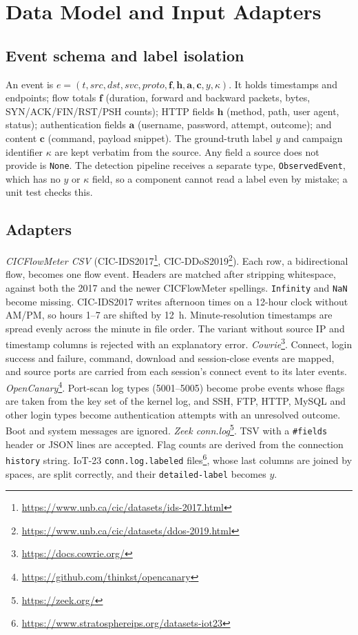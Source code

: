 \documentclass[conference]{IEEEtran}
\begin{document}
\section{Data Model and Input Adapters}\label{sec:data}
\subsection{Event schema and label isolation}
An event is $e=(t, \mathit{src}, \mathit{dst}, \mathit{svc}, \mathit{proto}, \mathbf{f}, \mathbf{h}, \mathbf{a}, \mathbf{c}, y, \kappa)$. It holds timestamps and endpoints; flow totals $\mathbf{f}$ (duration, forward and backward packets, bytes, SYN/ACK/FIN/RST/PSH counts); HTTP fields $\mathbf{h}$ (method, path, user agent, status); authentication fields $\mathbf{a}$ (username, password, attempt, outcome); and content $\mathbf{c}$ (command, payload snippet). The ground-truth label $y$ and campaign identifier $\kappa$ are kept verbatim from the source. Any field a source does not provide is \texttt{None}. The detection pipeline receives a separate type, \texttt{ObservedEvent}, which has no $y$ or $\kappa$ field, so a component cannot read a label even by mistake; a unit test checks this.

\subsection{Adapters}
\textit{CICFlowMeter CSV} (CIC-IDS2017\footnote{\url{https://www.unb.ca/cic/datasets/ids-2017.html}}, CIC-DDoS2019\footnote{\url{https://www.unb.ca/cic/datasets/ddos-2019.html}}). Each row, a bidirectional flow, becomes one flow event. Headers are matched after stripping whitespace, against both the 2017 and the newer CICFlowMeter spellings. \texttt{Infinity} and \texttt{NaN} become missing. CIC-IDS2017 writes afternoon times on a 12-hour clock without AM/PM, so hours 1--7 are shifted by 12~h. Minute-resolution timestamps are spread evenly across the minute in file order. The variant without source IP and timestamp columns is rejected with an explanatory error.
\textit{Cowrie}\footnote{\url{https://docs.cowrie.org/}}. Connect, login success and failure, command, download and session-close events are mapped, and source ports are carried from each session's connect event to its later events.
\textit{OpenCanary}\footnote{\url{https://github.com/thinkst/opencanary}}. Port-scan log types (5001--5005) become probe events whose flags are taken from the key set of the kernel log, and SSH, FTP, HTTP, MySQL and other login types become authentication attempts with an unresolved outcome. Boot and system messages are ignored.
\textit{Zeek conn.log}\footnote{\url{https://zeek.org/}}. TSV with a \texttt{\#fields} header or JSON lines are accepted. Flag counts are derived from the connection \texttt{history} string. IoT-23 \texttt{conn.log.labeled} files\footnote{\url{https://www.stratosphereips.org/datasets-iot23}}, whose last columns are joined by spaces, are split correctly, and their \texttt{detailed-label} becomes $y$.
\end{document}
